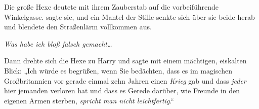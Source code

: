 Die große Hexe deutete mit ihrem Zauberstab auf die vorbeiführende Winkelgasse.  sagte sie, und ein Mantel der Stille senkte sich über sie beide herab und blendete den Straßenlärm vollkommen aus.

\emph{Was habe ich bloß falsch gemacht…}

Dann drehte sich die Hexe zu Harry und sagte mit einem mächtigen, eiskalten Blick: „Ich würde es begrüßen, wenn Sie bedächten, dass es im magischen Großbritannien vor gerade einmal zehn Jahren einen \emph{Krieg} gab und dass \emph{jeder} hier jemanden verloren hat und dass es Gerede darüber, wie Freunde in den eigenen Armen sterben, \emph{spricht man nicht leichtfertig}.“

